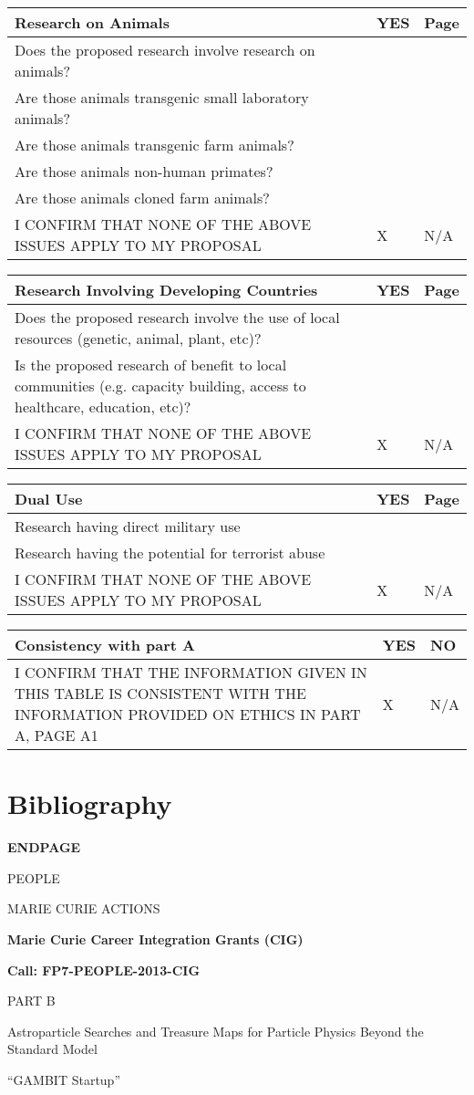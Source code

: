 \documentclass[a4paper,11pt]{article}
\newcommand{\projectname}[0]{GAMBIT Startup\xspace}
\newcommand{\mytitle}{Astroparticle Searches and Treasure Maps for Particle Physics Beyond the Standard Model}
\newcommand{\cover}[1]{%

\newpage
\begin{center}
\LARGE
\vspace{6cm}

\textbf{#1}
\vspace{2cm}

PEOPLE

MARIE CURIE ACTIONS
\vspace{2cm}

\textbf{Marie Curie Career Integration Grants (CIG)}

\textbf{Call: FP7-PEOPLE-2013-CIG}

\vspace{4cm}

PART B
\vspace{2cm}

\mytitle
\vspace{1cm}

``\projectname''

\cfoot{}

\end{center}

\newpage
}
\begin{document}
\begin{tabular}{|p{10cm}|p{1cm}|p{1cm}|}\hline
\bf Research on Animals											& YES	& Page	\\\hline
Does the proposed research involve research on animals?							&	&	\\\hline
Are those animals transgenic small laboratory animals?							&	&	\\\hline
Are those animals transgenic farm animals?								&	&	\\\hline
Are those animals non-human primates?									&	&	\\\hline
Are those animals cloned farm animals?									&	&	\\\hline
I CONFIRM THAT NONE OF THE ABOVE ISSUES APPLY TO MY PROPOSAL						&X	&N/A	\\\hline
\end{tabular}
\vspace{3mm}

\begin{tabular}{|p{10cm}|p{1cm}|p{1cm}|}\hline
\bf Research Involving Developing Countries								& YES	& Page	\\\hline
Does the proposed research involve the use of local resources (genetic, animal, plant, etc)?		&	&	\\\hline
Is the proposed research of benefit to local communities (e.g. capacity building,
access to healthcare, education, etc)?									&	&	\\\hline
I CONFIRM THAT NONE OF THE ABOVE ISSUES APPLY TO MY PROPOSAL						&X	&N/A	\\\hline
\end{tabular}
\vspace{3mm}

\begin{tabular}{|p{10cm}|p{1cm}|p{1cm}|}\hline
\bf Dual Use												& YES	& Page	\\\hline
Research having direct military use									&	&	\\\hline
Research having the potential for terrorist abuse							&	&	\\\hline
I CONFIRM THAT NONE OF THE ABOVE ISSUES APPLY TO MY PROPOSAL						&X	&N/A	\\\hline
\end{tabular}
\vspace{3mm}

\begin{tabular}{|p{10cm}|p{1cm}|p{1cm}|}\hline
\bf Consistency with part A										& YES	& NO	\\\hline
I CONFIRM THAT THE INFORMATION GIVEN IN THIS TABLE IS
CONSISTENT WITH THE INFORMATION PROVIDED ON ETHICS IN PART A, PAGE A1					&X	&N/A	\\\hline
\end{tabular}
\vspace{3mm}

\section{Bibliography}


\cover{ENDPAGE}
\end{document}
